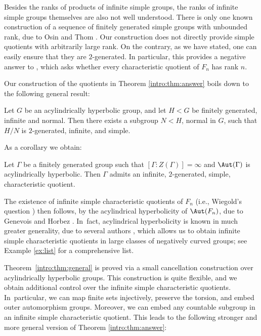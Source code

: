 Besides the ranks of products of infinite simple groups, the ranks of infinite simple groups themselves are also not well understood. There is only one known construction of a sequence of finitely generated simple groups with unbounded rank, due to Osin and Thom \cite{osinthom}.
Our construction does not directly provide simple quotients with arbitrarily large rank.
On the contrary, as we have stated, one can easily ensure that they are $2$-generated.
In particular, this provides a negative answer to \cite[Quest.\,17.62]{kourovka}, which asks whether every characteristic quotient of $F_n$ has rank $n$.

Our construction of the quotients in Theorem \ref{intro:thm:answer} boils down to the following general result:

\begin{theorem}
\label{intro:thm:general}
Let $G$ be an acylindrically hyperbolic group, and let $H < G$ be finitely generated, infinite and normal. Then there exists a subgroup $N < H$, normal in $G$, such that $H/N$ is $2$-generated, infinite, and simple.
\end{theorem}

As a corollary we obtain:

\begin{corollary}
\label{intro:cor:aut}
Let $\Gamma$ be a finitely generated group such that \hbox{$[\Gamma : Z(\Gamma)] = \infty$} and $\Aut(\Gamma)$ is acylindrically hyperbolic. Then $\Gamma$ admits an infinite, $2$-generated, simple, characteristic quotient.
\end{corollary}

The existence of infinite simple characteristic quotients of $F_n$ (i.e., Wiegold's question \cite[Quest.\,6.45]{kourovka}) then follows, by the acylindrical hyperbolicity of $\Aut(F_n)$, due to Genevois and Horbez \cite{auto:infend}. In~fact, acylindrical hyperbolicity is known in much greater generality, due to several authors \cite{auto:graph2, auto:graph1, auto:oneend, auto:infend, escalierhorbez, auto:artin}, which allows us to obtain infinite simple characteristic quotients in large classes of negatively curved groups; see Example \ref{ex:list} for a comprehensive list.

Theorem~\ref{intro:thm:general} is proved via a small cancellation construction over acylindrically hyperbolic groups. This construction is quite flexible, and we obtain additional control over the infinite simple characteristic quotients. In~particular, we can map finite sets injectively, preserve the torsion, and embed outer automorphism groups. Moreover, we can embed any countable subgroup in an infinite simple characteristic quotient. This leads to the following stronger and more general version of Theorem \ref{intro:thm:answer}:

